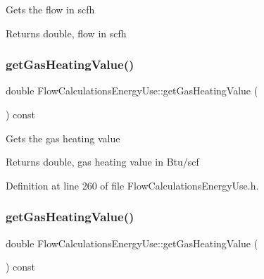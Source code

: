 Gets the flow in scfh

\begin{DoxyReturn}{Returns}
double, flow in scfh 
\end{DoxyReturn}
\mbox{\label{class_flow_calculations_energy_use_a42818c3f03cc70967eb6bb24094530a1}} 
\subsubsection{\texorpdfstring{get\+Gas\+Heating\+Value()}{getGasHeatingValue()}\hspace{0.1cm}{\footnotesize\ttfamily [1/3]}}
{\footnotesize\ttfamily double Flow\+Calculations\+Energy\+Use\+::get\+Gas\+Heating\+Value (\begin{DoxyParamCaption}{ }\end{DoxyParamCaption}) const\hspace{0.3cm}{\ttfamily [inline]}}

Gets the gas heating value

\begin{DoxyReturn}{Returns}
double, gas heating value in Btu/scf 
\end{DoxyReturn}


Definition at line 260 of file Flow\+Calculations\+Energy\+Use.\+h.

\mbox{\label{class_flow_calculations_energy_use_a42818c3f03cc70967eb6bb24094530a1}} 
\subsubsection{\texorpdfstring{get\+Gas\+Heating\+Value()}{getGasHeatingValue()}\hspace{0.1cm}{\footnotesize\ttfamily [2/3]}}
{\footnotesize\ttfamily double Flow\+Calculations\+Energy\+Use\+::get\+Gas\+Heating\+Value (\begin{DoxyParamCaption}{ }\end{DoxyParamCaption}) const\hspace{0.3cm}{\ttfamily [inline]}}

